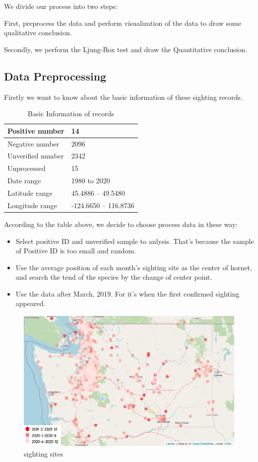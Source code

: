 \documentclass[12pt]{article}
\begin{document}
We divide our process into two steps: 

First, preprocess the data and perform visualization of the data to draw some qualitative conclusion.

Secondly, we perform the Ljung-Box test and draw the Quantitative conclusion.

\subsection{Data Preprocessing}
Firstly we want to know about the basic information of these sighting records.
\begin{table}[H]
	\caption{Basic Information of records}  
	\small
	\begin{center}  
		\begin{tabular}{|m{7cm}<{\centering}|m{7cm}<{\centering}|}  
			\hline  
			Positive number & 14  \\ \hline  
			Negative number& 2096\\ \hline  
			Unverified number &2342 \\  
			\hline 
			Unprocessed & 15 \\  
			\hline  
			Date range &1980   to   2020 \\  
			\hline
		    Latitude range & 45.4886  --   49.5480\\  
			\hline
			Longitude range & -124.6650   --  116.8736\\  
			\hline
		\end{tabular}  
	\end{center}  
\end{table}

According to the table above, we decide to choose process data in these way:
\begin{itemize}
	\item Select positive ID and unverified sample to anlysis. That's because the sample of Positive ID is too small and  random.
	\item Use the average position of each month's sighting site as the center of hornet, and search the tend of the species by the change of center point.
	\item Use the data after March, 2019. For it's when the first confirmed sighting appeared.
\end{itemize}

\begin{figure}[H]
	\centering
	\includegraphics[width=14cm,height=7cm]{./pictures/distribute1.png}
	\caption{sighting sites}
\end{figure}
\end{document}
